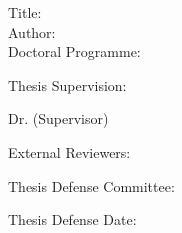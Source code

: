 
\begin{spacing}{1.3}
Title: \thesisTitle \\
Author: \thesisAuthor \\
Doctoral Programme:	 \DoctoralProgramme
\end{spacing}
Thesis Supervision: 
\begin{mydescription}
    \item Dr. \supervisorDetails  (Supervisor)
\end{mydescription}

\vspace{10 mm}
External Reviewers: 

\vspace{30 mm}

Thesis Defense Committee: %


\vspace{50mm}



Thesis Defense Date: %



\vspace{\fill}

